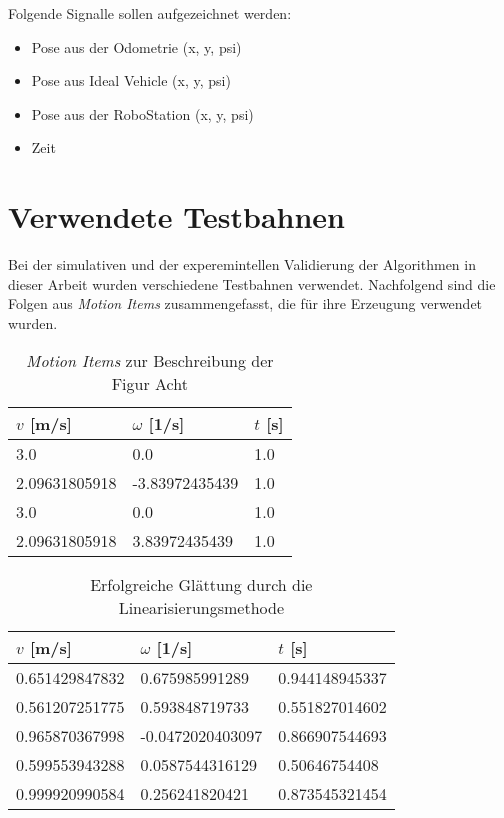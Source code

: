 Folgende Signalle sollen aufgezeichnet werden:

\begin{itemize}
\item  Pose aus der Odometrie (x, y, psi)
\item  Pose aus Ideal Vehicle (x, y, psi)
\item  Pose aus der RoboStation (x, y, psi)
\item  Zeit
\end{itemize}

\section{Verwendete Testbahnen}
Bei der simulativen und der experemintellen Validierung der Algorithmen in dieser Arbeit wurden verschiedene Testbahnen verwendet. Nachfolgend sind die Folgen aus \textit{Motion Items} zusammengefasst, die für ihre Erzeugung verwendet wurden. 

\begin{table}[htbp]
\caption{\textit{Motion Items} zur Beschreibung der Figur Acht}
\centering
\begin{tabular}{@{}lll@{}} \toprule
    $v$ [\si{m/s}] & $\omega$ [\si{1/s}]& $t$ [\si{s}]  \\ \midrule
    3.0 & 0.0 & 1.0 \\ 
    2.09631805918 & -3.83972435439 & 1.0 \\ 
    3.0 & 0.0 & 1.0 \\ 
    2.09631805918 & 3.83972435439 & 1.0 \\ \bottomrule
\end{tabular}
\label{tab:simu-motion-items}
\end{table}

\begin{table}[htbp]
\caption{Erfolgreiche Glättung durch die Linearisierungsmethode}
\centering
\begin{tabular}{@{}lll@{}} \toprule
    $v$ [\si{m/s}] & $\omega$ [\si{1/s}]& $t$ [\si{s}]  \\ \midrule
	0.651429847832 & 0.675985991289 & 0.944148945337 \\
	0.561207251775 & 0.593848719733 & 0.551827014602 \\
	0.965870367998 & -0.0472020403097 & 0.866907544693 \\
	0.599553943288 & 0.0587544316129 & 0.50646754408 \\
	0.999920990584 & 0.256241820421 & 0.873545321454 \\ \bottomrule
\end{tabular}
\label{tab:linearization-successfull-queue}
\end{table}

